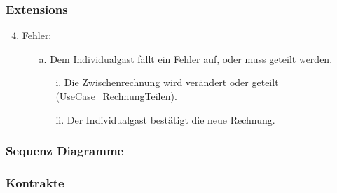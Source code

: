\documentclass[./detailed_overview_usecases.tex]{subfiles}
\begin{document}
    \subsubsection*{Extensions}
    \begin{enumerate}
        \setcounter{enumi}{3}
        \item Fehler:
        \begin{itemize}
            \item[a.] Dem Individualgast fällt ein Fehler auf, oder muss geteilt werden.
            \begin{itemize}
                \item[i.] Die Zwischenrechnung wird verändert oder geteilt (UseCase_RechnungTeilen).
                \item[ii.] Der Individualgast bestätigt die neue Rechnung.
            \end{itemize}
        \end{itemize}
    \end{enumerate}
    \subsubsection{Sequenz Diagramme}
    \subsubsection{Kontrakte}
\end{document}
